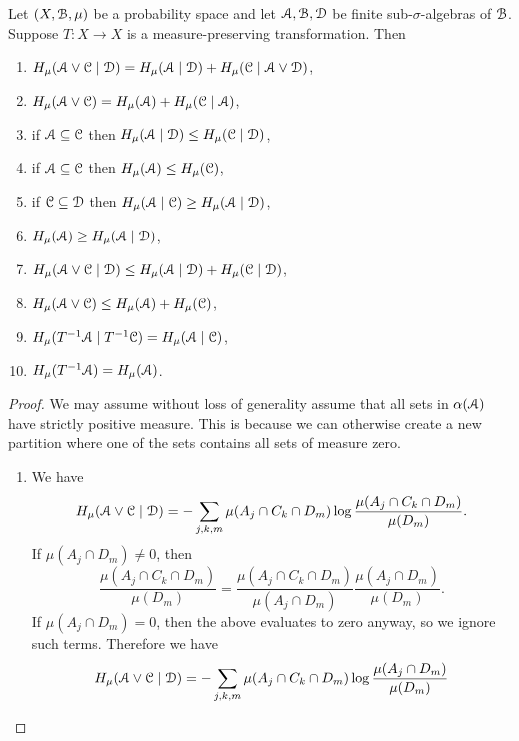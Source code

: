 \begin{theorem} \label{thm:walters-4.3}
	Let $(X, \mathcal{B}, \mu)$ be a probability space and let $\mathcal{A}, \mathcal{B}, \mathcal{D}$ be finite sub-$\sigma$-algebras of $\mathcal{B}$. Suppose $T : X \to X$ is a measure-preserving transformation. Then
	\begin{enumerate}
		\item $H_\mu(\mathcal{A} \vee \mathcal{C} \mid \mathcal{D}) = H_\mu(\mathcal{A} \mid \mathcal{D}) + H_\mu(\mathcal{C} \mid \mathcal{A} \vee \mathcal{D})$, \label{walters-thm-4.3:1}
		\item $H_\mu(\mathcal{A} \vee \mathcal{C}) = H_\mu(\mathcal{A}) + H_\mu(\mathcal{C} \mid \mathcal{A})$, \label{walters-thm-4.3:2}
		\item if $\mathcal{A} \subseteq \mathcal{C}$  then $H_\mu(\mathcal{A} \mid \mathcal{D}) \leq H_\mu(\mathcal{C} \mid \mathcal{D})$, \label{walters-thm-4.3:3}
		\item if $\mathcal{A} \subseteq \mathcal{C}$  then $H_\mu(\mathcal{A}) \leq H_\mu(\mathcal{C})$, \label{walters-thm-4.3:4}
		\item if $\mathcal{C} \subseteq \mathcal{D}$ then $H_\mu(\mathcal{A} \mid \mathcal{C}) \geq H_\mu(\mathcal{A} \mid \mathcal{D})$, \label{walters-thm-4.3:5}
		\item $H_\mu(\mathcal{A}) \geq H_\mu(\mathcal{A} \mid \mathcal{D})$, \label{walters-thm-4.3:6}
		\item $H_\mu(\mathcal{A} \vee \mathcal{C} \mid \mathcal{D}) \leq H_\mu(\mathcal{A} \mid \mathcal{D}) + H_\mu(\mathcal{C} \mid \mathcal{D})$, \label{walters-thm-4.3:7}
		\item $H_\mu(\mathcal{A} \vee \mathcal{C}) \leq H_\mu(\mathcal{A}) + H_\mu(\mathcal{C})$, \label{walters-thm-4.3:8}
		\item $H_\mu(T^{-1}\mathcal{A} \mid T^{-1}\mathcal{C}) = H_\mu(\mathcal{A} \mid \mathcal{C})$, \label{walters-thm-4.3:9}
		\item $H_\mu(T^{-1}\mathcal{A}) = H_\mu(\mathcal{A})$. \label{walters-thm-4.3:10}
	\end{enumerate}
	\begin{proof}
		We may assume without loss of generality assume that all sets in $\alpha(\mathcal{A})$ have strictly positive measure. This is because we can otherwise create a new partition where one of the sets contains all sets of measure zero.
		\begin{enumerate}
			\item We have
				\[
					H_\mu(\mathcal{A} \vee \mathcal{C} \mid \mathcal{D}) = -\sum_{j, k, m}{\mu(A_j \cap C_k \cap D_m) \log{\frac{\mu(A_j \cap C_k \cap D_m)}{\mu(D_m)}}}.
				\]
				If $\mu(A_j \cap D_m) \neq 0$, then
				\[
					\frac{\mu(A_j \cap C_k \cap D_m)}{\mu(D_m)} = \frac{\mu(A_j \cap C_k \cap D_m)}{\mu(A_j \cap D_m)} \frac{\mu(A_j \cap D_m)}{\mu(D_m)}.
				\]
				If $\mu(A_j \cap D_m) = 0$, then the above evaluates to zero anyway, so we ignore such terms. Therefore we have
				\begin{align*}
					H_\mu(\A \join \C \mid \D) &= -\sum_{j, k, m}{\mu(A_j \cap C_k \cap D_m) \log{\frac{\mu(A_j \cap D_m)}{\mu(D_m)}}} \\

\end{align*}
\end{enumerate}
\end{proof}
\end{theorem}
